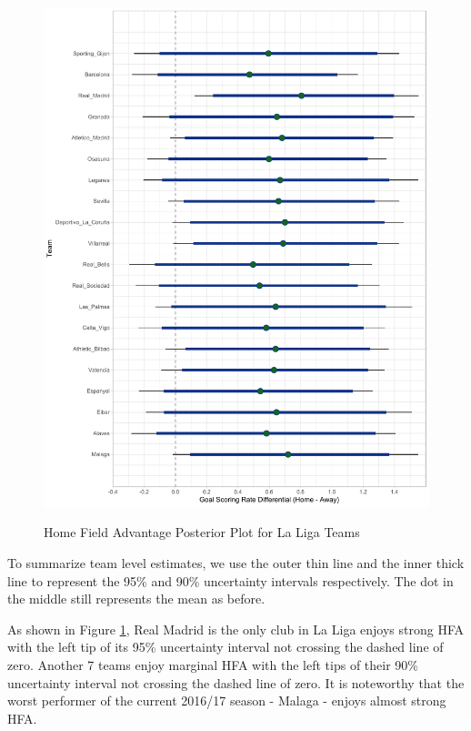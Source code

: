 \documentclass[USenglish]{article}
\begin{document}
\begin{figure}
\caption{Home Field Advantage Posterior Plot for La Liga Teams}
{\includegraphics[width=0.90\linewidth]{HFA_La_Liga11.pdf}}
\label{fig32}
\end{figure}

To summarize team level estimates, we use the outer thin line and the inner thick line to represent the 95\% and 90\% uncertainty intervals respectively. The dot in the middle still represents the mean as before.


As shown in Figure \ref{fig32}, Real Madrid is the only club in La Liga enjoys strong HFA with the left tip of its 95\% uncertainty interval not crossing the dashed line of zero. Another 7 teams enjoy marginal HFA with the left tips of their 90\% uncertainty interval not crossing the dashed line of zero. It is noteworthy that the worst performer of the current 2016/17 season - Malaga - enjoys almost strong HFA.     
\end{document}
